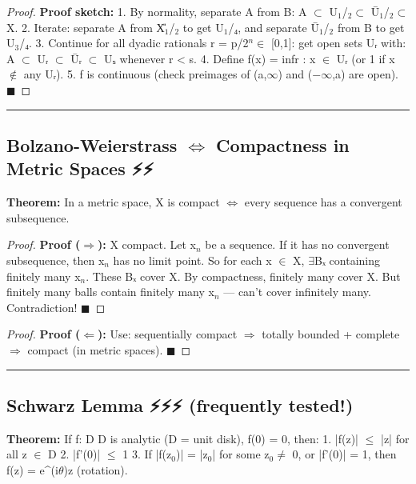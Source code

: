 \documentclass[12pt,a4paper,openany]{book}
\begin{document}
{{\begin{proof}
\textbf{Proof sketch:}
1. By normality, separate A from B: A $\subset$ U$_1$/$_2\subset$ Ū$_1$/$_2\subset$ X\B.
2. Iterate: separate A from X\U$_1$/$_2$ to get U$_1$/₄, and separate Ū$_1$/$_2$ from B to get U$_3$/₄.
3. Continue for all dyadic rationals r = p/2$^n\in$ [0,1]: get open sets Uᵣ with:
   A $\subset$ Uᵣ $\subset$ Ūᵣ $\subset$ Uₛ whenever r < s.
4. Define f(x) = inf{r : x $\in$ Uᵣ} (or 1 if x $\notin$ any Uᵣ).
5. f is continuous (check preimages of (a,$\infty$) and (−$\infty$,a) are open). $\blacksquare$
\end{proof}

\bigskip\noindent\rule{\textwidth}{0.4pt}\bigskip

\subsection{Bolzano-Weierstrass $\Longleftrightarrow$ Compactness in Metric Spaces ⚡⚡}

\begin{tcolorbox}[colback=lightblue,colframe=thmblue,title=\textbf{Theorem},breakable,boxrule=1.5pt]
\textbf{Theorem:} In a metric space, X is compact $\Longleftrightarrow$ every sequence has a convergent subsequence.
\end{tcolorbox}

\begin{proof}
\textbf{Proof ($\Longrightarrow$):} X compact. Let {x$_n$} be a sequence. If it has no convergent subsequence, then {x$_n$} has no limit point. So for each x $\in$ X, $\exists$Bₓ containing finitely many x$_n$. These Bₓ cover X. By compactness, finitely many cover X. But finitely many balls contain finitely many x$_n$ — can't cover infinitely many. Contradiction! $\blacksquare$
\end{proof}

\begin{proof}
\textbf{Proof ($\Longleftarrow$):} Use: sequentially compact $\Longrightarrow$ totally bounded + complete $\Longrightarrow$ compact (in metric spaces). $\blacksquare$
\end{proof}

\bigskip\noindent\rule{\textwidth}{0.4pt}\bigskip


\subsection{Schwarz Lemma ⚡⚡⚡ (frequently tested!)}

\begin{tcolorbox}[colback=lightblue,colframe=thmblue,title=\textbf{Theorem},breakable,boxrule=1.5pt]
\textbf{Theorem:} If f: D  D is analytic (D = unit disk), f(0) = 0, then:
1. |f(z)| $\leq$ |z| for all z $\in$ D
2. |f'(0)| $\leq$ 1
3. If |f(z$_0$)| = |z$_0$| for some z$_0\neq$ 0, or |f'(0)| = 1, then f(z) = e^(i$\theta$)z (rotation).
\end{tcolorbox}

}}
\end{document}
